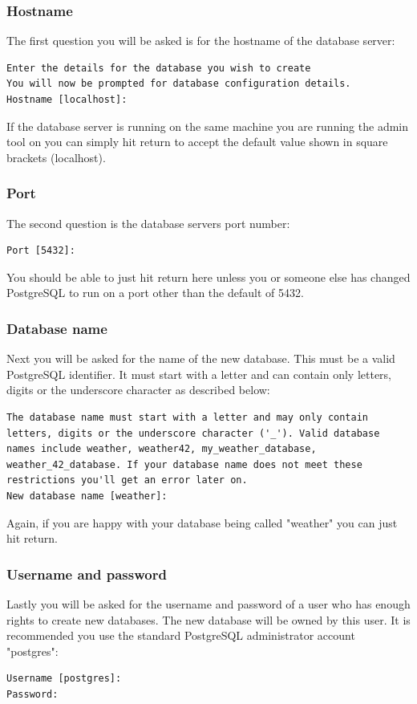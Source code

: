 \documentclass[a4paper,10pt,draft]{book}
\begin{document}
\subsubsection{Hostname}
The first question you will be asked is for the hostname of the database server:
\begin{verbatim}
Enter the details for the database you wish to create
You will now be prompted for database configuration details.
Hostname [localhost]:
\end{verbatim}

If the database server is running on the same machine you are running the admin tool on you can simply hit return to accept the default value shown in square brackets (localhost).

\subsubsection{Port}
The second question is the database servers port number:
\begin{verbatim}
Port [5432]:
\end{verbatim}
You should be able to just hit return here unless you or someone else has changed PostgreSQL to run on a port other than the default of 5432.

\subsubsection{Database name}
Next you will be asked for the name of the new database. This must be a valid PostgreSQL identifier. It must start with a letter and can contain only letters, digits or the underscore character as described below:

\begin{verbatim}
The database name must start with a letter and may only contain 
letters, digits or the underscore character ('_'). Valid database
names include weather, weather42, my_weather_database, 
weather_42_database. If your database name does not meet these 
restrictions you'll get an error later on.
New database name [weather]:
\end{verbatim}

Again, if you are happy with your database being called "weather" you can just hit return.

\subsubsection{Username and password}
Lastly you will be asked for the username and password of a user who has enough rights to create new databases. The new database will be owned by this user. It is recommended you use the standard PostgreSQL administrator account "postgres":
\begin{verbatim}
Username [postgres]:
Password:
\end{verbatim}
\end{document}
